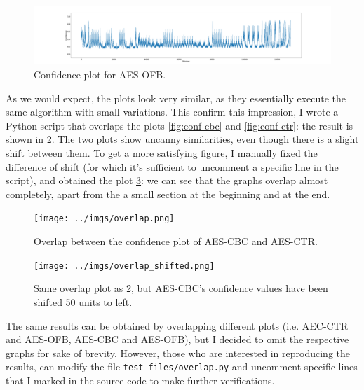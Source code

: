 \documentclass[12pt,a4paper]{book}
\theoremstyle{definition}
\begin{document}
	\begin{figure}[!ht]
		\hspace*{-3.6cm}
		\includegraphics[scale=0.18]{../test_files/output_nosymbolic_FastSpec_wider/window50_overlap49_fig/testing_AES_CBC_nosymbolic.png}
		\caption{Confidence plot for AES-OFB.}
		\label{fig:conf-ofb}
	\end{figure}
	As we would expect, the plots look very similar, as they essentially execute the same algorithm with small variations.
	This confirm this impression, I wrote a Python script that overlaps the plots \ref{fig:conf-cbc} and \ref{fig:conf-ctr}: the result is shown in \ref{fig:overlap}. The two plots show uncanny similarities, even though there is a slight shift between them. To get a more satisfying figure, I manually fixed the difference of shift (for which it's sufficient to uncomment a specific line in the script), and obtained the plot \ref{fig:overlap-shifted}: we can see that the graphs overlap almost completely, apart from the a small section at the beginning and at the end.
	
	\begin{figure}[!ht]
		\hspace*{-1.5cm}
		\texttt{[image: ../imgs/overlap.png]}
		\caption{Overlap between the confidence plot of AES-CBC and AES-CTR.}
		\label{fig:overlap}
	\end{figure}
	
	\begin{figure}[!ht]
		\hspace*{-1.5cm}
		\texttt{[image: ../imgs/overlap\_shifted.png]}
		\caption{Same overlap plot as \ref{fig:overlap}, but AES-CBC's confidence values have been shifted 50 units to left.}
		\label{fig:overlap-shifted}
	\end{figure}

	The same results can be obtained by overlapping different plots (i.e. AEC-CTR and AES-OFB, AES-CBC and AES-OFB), but I decided to omit the respective graphs for sake of brevity. However, those who are interested in reproducing the results, can modify the file \texttt{test\_files/overlap.py} and uncomment specific lines that I marked in the source code to make further verifications.
	
\end{document}
